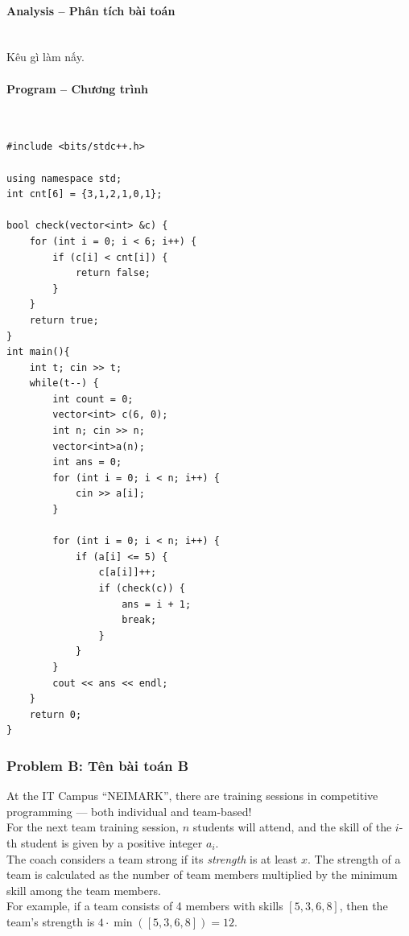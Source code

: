 \documentclass{article}
\begin{document}
\paragraph{Analysis -- Phân tích bài toán} \mbox{} \\

Kêu gì làm nấy.

\paragraph{Program -- Chương trình} \mbox{} \\

\begin{lstlisting}
#include <bits/stdc++.h>

using namespace std;
int cnt[6] = {3,1,2,1,0,1};

bool check(vector<int> &c) {
	for (int i = 0; i < 6; i++) {
		if (c[i] < cnt[i]) {
			return false;
		}
	}
	return true;
}
int main(){
	int t; cin >> t;
	while(t--) {
		int count = 0;
		vector<int> c(6, 0);
		int n; cin >> n;
		vector<int>a(n);
		int ans = 0;
		for (int i = 0; i < n; i++) {
			cin >> a[i];            
		}
		
		for (int i = 0; i < n; i++) {
			if (a[i] <= 5) {
				c[a[i]]++;
				if (check(c)) {
					ans = i + 1;
					break;
				}
			}               
		}
		cout << ans << endl;
	}
	return 0;
}
\end{lstlisting}

\subsubsection{Problem B: Tên bài toán B}

At the IT Campus ``NEIMARK'', there are training sessions in competitive programming — both individual and team-based!\\

For the next team training session, $n$ students will attend, and the skill of the $i$-th student is given by a positive integer $a_i$.\\

The coach considers a team strong if its \textit{strength} is at least $x$. The strength of a team is calculated as the number of team members multiplied by the minimum skill among the team members.\\

For example, if a team consists of 4 members with skills $[5, 3, 6, 8]$, then the team's strength is $4 \cdot \min([5, 3, 6, 8]) = 12$.\\
\end{document}
